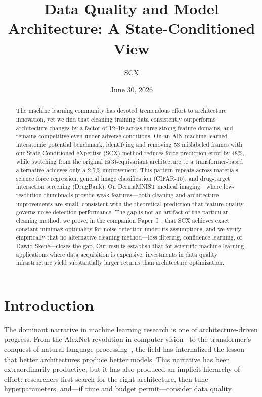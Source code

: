 \documentclass[12pt,a4paper]{article}
\title{Data Quality and Model Architecture: A State-Conditioned View}
\author{SCX}
\date{June 30, 2026}
\begin{document}
\maketitle

\begin{abstract}
The machine learning community has devoted tremendous effort to architecture innovation, yet we find that cleaning training data consistently outperforms architecture changes by a factor of 12--19 across three strong-feature domains, and remains competitive even under adverse conditions. On an AlN machine-learned interatomic potential benchmark, identifying and removing 53 mislabeled frames with our State-Conditioned eXpertise (SCX) method reduces force prediction error by 48\%, while switching from the original E(3)-equivariant architecture to a transformer-based alternative achieves only a 2.5\% improvement. This pattern repeats across materials science force regression, general image classification (CIFAR-10), and drug-target interaction screening (DrugBank). On DermaMNIST medical imaging---where low-resolution thumbnails provide weak features---both cleaning and architecture improvements are small, consistent with the theoretical prediction that feature quality governs noise detection performance. The gap is not an artifact of the particular cleaning method: we prove, in the companion Paper~I~\cite{xi2025fundamental}, that SCX achieves exact constant minimax optimality for noise detection under its assumptions, and we verify empirically that no alternative cleaning method---loss filtering, confidence learning, or Dawid-Skene---closes the gap. Our results establish that for scientific machine learning applications where data acquisition is expensive, investments in data quality infrastructure yield substantially larger returns than architecture optimization.
\end{abstract}

\section{Introduction}

The dominant narrative in machine learning research is one of architecture-driven progress. From the AlexNet revolution in computer vision~\cite{krizhevsky2012imagenet} to the transformer's conquest of natural language processing~\cite{vaswani2017attention}, the field has internalized the lesson that better architectures produce better models. This narrative has been extraordinarily productive, but it has also produced an implicit hierarchy of effort: researchers first search for the right architecture, then tune hyperparameters, and---if time and budget permit---consider data quality.
\end{document}
